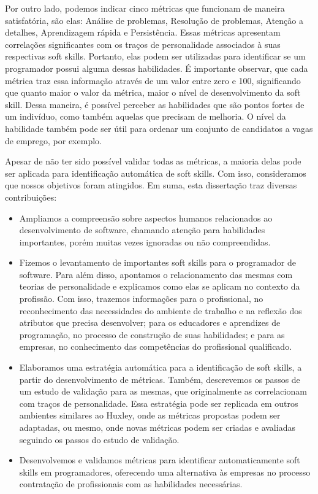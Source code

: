 Por outro lado, podemos indicar cinco métricas que funcionam de maneira satisfatória, são elas: Análise de problemas, Resolução de problemas, Atenção a detalhes, Aprendizagem rápida e Persistência. Essas métricas apresentam correlações significantes com os traços de personalidade associados à suas respectivas soft skills.
Portanto, elas podem ser utilizadas para identificar se um programador possui alguma dessas habilidades. É importante observar, que cada métrica traz essa informação através de um valor entre zero e 100, significando que quanto maior o valor da métrica, maior o nível de desenvolvimento da soft skill. Dessa maneira, é possível perceber as habilidades que são pontos fortes de um indivíduo, como também aquelas que precisam de melhoria. O nível da habilidade também pode ser útil para ordenar um conjunto de candidatos a vagas de emprego, por exemplo.

Apesar de não ter sido possível validar todas as métricas, a maioria delas pode ser aplicada para identificação automática de soft skills. Com isso, consideramos que nossos objetivos foram atingidos. Em suma, esta dissertação traz diversas contribuições:

\begin{itemize}
 \item Ampliamos a compreensão sobre aspectos humanos relacionados ao desenvolvimento de software, chamando atenção para habilidades importantes, porém muitas vezes ignoradas ou não compreendidas. 

 \item Fizemos o levantamento de importantes soft skills para o programador de software. Para além disso, apontamos o relacionamento das mesmas com teorias de personalidade e explicamos como elas se aplicam no contexto da profissão. Com isso, trazemos informações para o profissional, no reconhecimento das necessidades do ambiente de trabalho e na reflexão dos atributos que precisa desenvolver; para os educadores e aprendizes de programação, no processo de construção de suas habilidades; e para as empresas, no conhecimento das competências do profissional qualificado.

 \item Elaboramos uma estratégia automática para a identificação de soft skills, a partir do desenvolvimento de métricas. Também, descrevemos os passos de um estudo de validação para as mesmas, que originalmente as correlacionam com traços de personalidade.
Essa estratégia pode ser replicada em outros ambientes similares ao Huxley, onde as métricas propostas podem ser adaptadas, ou mesmo, onde novas métricas podem ser criadas e avaliadas seguindo os passos do estudo de validação.

 \item Desenvolvemos e validamos métricas para identificar automaticamente soft skills em programadores, oferecendo uma alternativa às empresas no processo contratação de profissionais com as habilidades necessárias.
\end{itemize}

